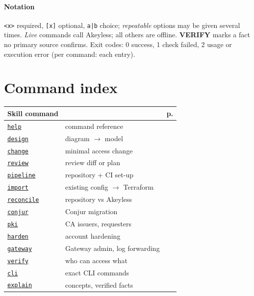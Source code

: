 \documentclass[10pt,a4paper,openany]{report}
\begin{document}
\paragraph{Notation} \texttt{<x>} required, \texttt{[x]} optional, \texttt{a|b} choice; \emph{repeatable}
options may be given several times. \emph{Live} commands call Akeyless; all others are offline.
\textbf{VERIFY} marks a fact no primary source confirms. Exit codes: 0 success, 1 check failed,
2 usage or execution error (per command: each entry).

\section{Command index}
\begin{minipage}[t]{0.47\linewidth}\small
\begin{tabularx}{\linewidth}{@{}lXr@{}}
\toprule
\textbf{Skill command} & & \textbf{p.} \\ \midrule
\hyperref[skill:help]{\texttt{help}} & command reference & \pageref{skill:help} \\
\hyperref[skill:design]{\texttt{design}} & diagram $\rightarrow$ model & \pageref{skill:design} \\
\hyperref[skill:change]{\texttt{change}} & minimal access change & \pageref{skill:change} \\
\hyperref[skill:review]{\texttt{review}} & review diff or plan & \pageref{skill:review} \\
\hyperref[skill:pipeline]{\texttt{pipeline}} & repository + CI set-up & \pageref{skill:pipeline} \\
\hyperref[skill:import]{\texttt{import}} & existing config $\rightarrow$ Terraform & \pageref{skill:import} \\
\hyperref[skill:reconcile]{\texttt{reconcile}} & repository vs Akeyless & \pageref{skill:reconcile} \\
\hyperref[skill:conjur]{\texttt{conjur}} & Conjur migration & \pageref{skill:conjur} \\
\hyperref[skill:pki]{\texttt{pki}} & CA issuers, requesters & \pageref{skill:pki} \\
\hyperref[skill:harden]{\texttt{harden}} & account hardening & \pageref{skill:harden} \\
\hyperref[skill:gateway]{\texttt{gateway}} & Gateway admin, log forwarding & \pageref{skill:gateway} \\
\hyperref[skill:verify]{\texttt{verify}} & who can access what & \pageref{skill:verify} \\
\hyperref[skill:cli]{\texttt{cli}} & exact CLI commands & \pageref{skill:cli} \\
\hyperref[skill:explain]{\texttt{explain}} & concepts, verified facts & \pageref{skill:explain} \\
\bottomrule
\end{tabularx}
\end{minipage}\hfill
\end{document}
